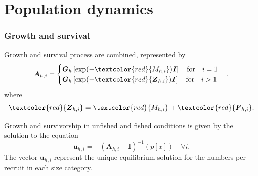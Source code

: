 \documentclass{beamer}
\begin{document}
\section{Population dynamics}


\begin{frame}
\frametitle{Growth and survival}
Growth and survival process are combined, represented by
\begin{equation*}
  \boldsymbol{A}_{h,i} =
  \begin{cases}
    \boldsymbol{G}_{h} \left[ \exp(- \textcolor{red}{M_{h,i}}) \boldsymbol{I} \right] \quad  \text{for} \quad i = 1\\
    \boldsymbol{G}_{h} \left[ \exp(-\textcolor{red}{\boldsymbol{Z}_{h,i}}) \boldsymbol{I} \right] \quad \text{for} \quad i > 1
  \end{cases}.
\end{equation*}
where
\begin{equation*}
  \textcolor{red}{\boldsymbol{Z}_{h,i}} = \textcolor{red}{M_{h,i}} +
  \textcolor{red}{\boldsymbol{F}_{h,i}}.
\end{equation*}

Growth and survivorship in unfished and fished conditions is given by the
solution to the equation
\begin{equation*}
  \boldsymbol{u}_{h,i} = -(\boldsymbol{A}_{h,i} - \boldsymbol{I})^{-1} (p[x])
  \quad \forall i.
\end{equation*}
The vector $\boldsymbol{u}_{h,i}$ represent the unique equilibrium solution for the
numbers per recruit in each size category.
\end{frame}

\end{document}
